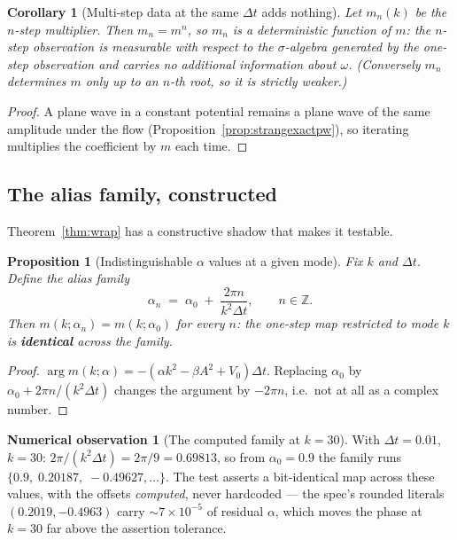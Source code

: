 \documentclass[11pt,a4paper]{article}
\theoremstyle{plain}
\newtheorem{proposition}[theorem]{Proposition}
\newtheorem{corollary}[theorem]{Corollary}
\theoremstyle{definition}
\newtheorem{observation}[theorem]{Numerical observation}
\theoremstyle{remark}
\newcommand{\Z}{\mathbb{Z}}
\newcommand{\dt}{\Delta t}
\begin{document}
\begin{corollary}[Multi-step data at the same $\dt$ adds nothing]
\label{cor:multistep}
Let $m_n(k)$ be the $n$-step multiplier. Then $m_n = m^n$, so $m_n$ is a deterministic
function of $m$: the $n$-step observation is measurable with respect to the $\sigma$-algebra
generated by the one-step observation and carries no additional information about
$\omega$. (Conversely $m_n$ determines $m$ only up to an $n$-th root, so it is strictly
weaker.)
\end{corollary}

\begin{proof}
A plane wave in a constant potential remains a plane wave of the same amplitude under the
flow (Proposition~\ref{prop:strangexactpw}), so iterating multiplies the coefficient by
$m$ each time.
\end{proof}

\subsection{The alias family, constructed}
\label{sec:alias}

Theorem~\ref{thm:wrap} has a constructive shadow that makes it testable.

\begin{proposition}[Indistinguishable $\alpha$ values at a given mode]
\label{prop:alias}
Fix $k$ and $\dt$. Define the alias family
\begin{equation}
\label{eq:aliasfamily}
\alpha_n \;=\; \alpha_0 \;+\; \frac{2\pi n}{k^2\dt},\qquad n\in\Z .
\end{equation}
Then $m(k;\alpha_n) = m(k;\alpha_0)$ for every $n$: the one-step map restricted to mode
$k$ is \textbf{identical} across the family.
\end{proposition}

\begin{proof}
$\arg m(k;\alpha) = -(\alpha k^2 - \beta A^2 + V_0)\dt$. Replacing $\alpha_0$ by
$\alpha_0 + 2\pi n/(k^2\dt)$ changes the argument by $-2\pi n$, i.e.\ not at all as a
complex number.
\end{proof}

\begin{observation}[The computed family at $k=30$]
\label{obs:alias}
With $\dt=0.01$, $k=30$: $2\pi/(k^2\dt) = 2\pi/9 = 0.69813$, so from $\alpha_0=0.9$ the
family runs $\{0.9,\;0.20187,\;-0.49627,\dots\}$. The test asserts a bit-identical map
across these values, with the offsets \emph{computed}, never hardcoded --- the spec's
rounded literals $(0.2019, -0.4963)$ carry $\sim7\times10^{-5}$ of residual $\alpha$,
which moves the phase at $k=30$ far above the assertion tolerance.
\end{observation}
\end{document}
